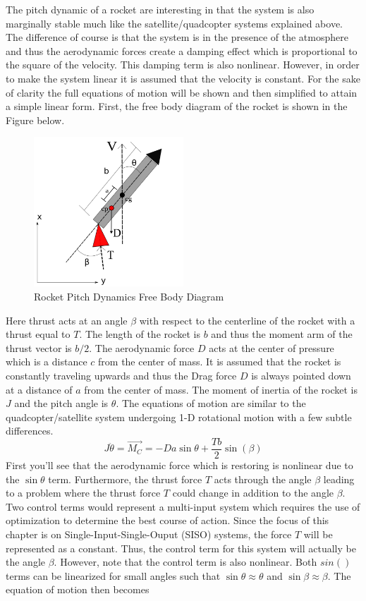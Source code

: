The pitch dynamic of a rocket are interesting in that the system is also marginally stable much like the satellite/quadcopter systems explained above. The difference of course is that the system is in the presence of the atmosphere and thus the aerodynamic forces create a damping effect which is proportional to the square of the velocity. This damping term is also nonlinear. However, in order to make the system linear it is assumed that the velocity is constant. For the sake of clarity the full equations of motion will be shown and then simplified to attain a simple linear form. First, the free body diagram of the rocket is shown in the Figure below.
\begin{figure}[H]
    \centering
    \includegraphics[width=0.5\textwidth]{Figures/Rocket.png}
    \caption{Rocket Pitch Dynamics Free Body Diagram}
\end{figure}
Here thrust acts at an angle $\beta$ with respect to the centerline of the rocket with a thrust equal to $T$. The length of the rocket is $b$ and thus the moment arm of the thrust vector is $b/2$. The aerodynamic force $D$ acts at the center of pressure which is a distance $c$ from the center of mass. It is assumed that the rocket is constantly traveling upwards and thus the Drag force $D$ is always pointed down at a distance of $a$ from the center of mass. The moment of inertia of the rocket is $J$ and the pitch angle is $\theta$. The equations of motion are similar to the quadcopter/satellite system undergoing 1-D rotational motion with a few subtle differences. 
\begin{equation}
    J\ddot{\theta} = \vec{M_C} = -D a \sin{\theta} + \frac{Tb}{2} \sin(\beta)
\end{equation}
First you'll see that the aerodynamic force which is restoring is nonlinear due to the $\sin{\theta}$ term. Furthermore, the thrust force $T$ acts through the angle $\beta$ leading to a problem where the thrust force $T$ could change in addition to the angle $\beta$. Two control terms would represent a multi-input system which requires the use of optimization to determine the best course of action. Since the focus of this chapter is on Single-Input-Single-Ouput (SISO) systems, the force $T$ will be represented as a constant. Thus, the control term for this system will actually be the angle $\beta$. However, note that the control term is also nonlinear. Both $sin()$ terms can be linearized for small angles such that $\sin{\theta} \approx \theta$ and $\sin{\beta} \approx \beta$. The equation of motion then becomes
